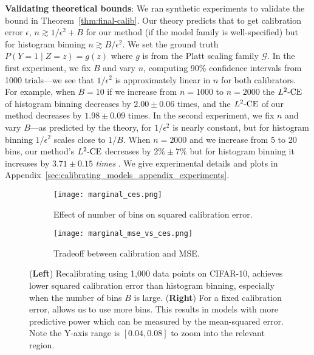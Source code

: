 \textbf{Validating theoretical bounds}: We ran synthetic experiments to validate the bound in Theorem~\ref{thm:final-calib}. Our theory predicts that to get calibration error $\epsilon$, $n \gtrsim 1/\epsilon^2 + B$ for our method (if the model family is well-specified) but for histogram binning $n \gtrsim B/\epsilon^2$. We set the ground truth  $P(Y = 1 \mid Z=z) = g(z)$ where $g$ is from the Platt scaling family $\mathcal{G}$. In the first experiment, we fix $B$ and vary $n$, computing 90\% confidence intervals from 1000 trials---we see that $1/\epsilon^2$ is approximately linear in $n$ for both calibrators. For example, when $B=10$ if we increase from $n=1000$ to $n=2000$ the $L^2\textup{-CE}$ of histogram binning decreases by $2.00 \pm 0.06$ times, and the $L^2\textup{-CE}$ of our method decreases by $1.98 \pm 0.09$ times. In the second experiment, we fix $n$ and vary $B$---as predicted by the theory, for \ourcal{} $1/\epsilon^2$ is nearly constant, but for histogram binning $1/\epsilon^2$ scales close to $1/B$. When $n = 2000$ and we increase from $5$ to $20$ bins, our method's $L^2\textup{-CE}$ decreases by $2\% \pm 7\%$ but for histogram binning it increases by $3.71 \pm 0.15$ \emph{times} .
We give experimental details and plots in Appendix~\ref{sec:calibrating_models_appendix_experiments}.

\begin{figure}
  \centering
  \centering
     \begin{subfigure}[b]{0.54\textwidth}
         \centering
         \texttt{[image: marginal\_ces.png]}
         \caption{Effect of number of bins on squared calibration error. }
         \label{fig:marginal_calibrator_comparison_cifar}
     \end{subfigure}
     \hfill
     \begin{subfigure}[b]{0.44\textwidth}
         \centering
         \texttt{[image: marginal\_mse\_vs\_ces.png]}
         \caption{Tradeoff between calibration and MSE. }
         \label{fig:cifar_calibrator_cmp_mse_ce}
     \end{subfigure}
  \caption{
  (\textbf{Left}) Recalibrating using 1,000 data points on CIFAR-10, \ourcal{} achieves lower squared calibration error than histogram binning, especially when the number of bins $B$ is large.
  (\textbf{Right}) For a fixed calibration error, \ourcal{} allows us to use more bins. This results in models with more predictive power which can be measured by the mean-squared error. Note the  Y-axis range is $[0.04, 0.08]$ to zoom into the relevant region.
  }
  \label{fig:nan2}
\end{figure}

